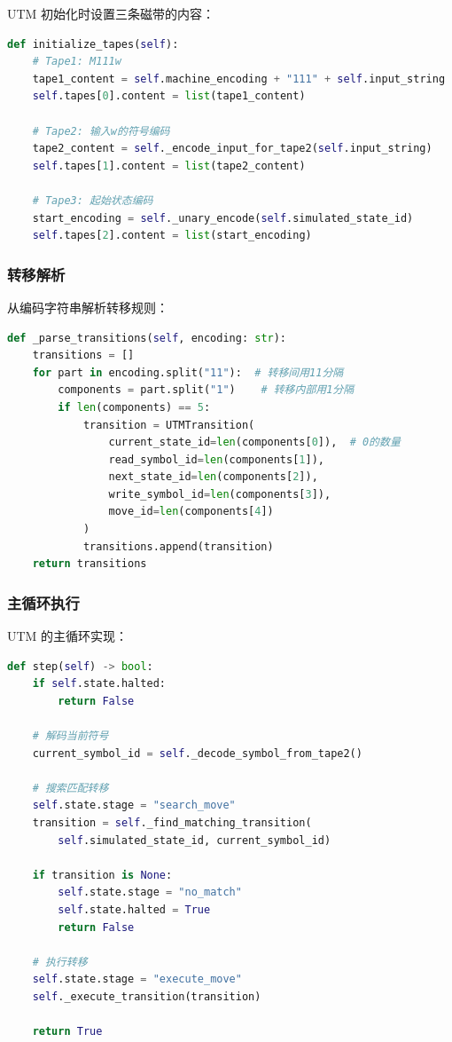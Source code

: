\documentclass{sysucseexp}
\begin{document}
UTM 初始化时设置三条磁带的内容：

\begin{lstlisting}[language=Python]
def initialize_tapes(self):
    # Tape1: M111w
    tape1_content = self.machine_encoding + "111" + self.input_string
    self.tapes[0].content = list(tape1_content)
    
    # Tape2: 输入w的符号编码
    tape2_content = self._encode_input_for_tape2(self.input_string)
    self.tapes[1].content = list(tape2_content)
    
    # Tape3: 起始状态编码
    start_encoding = self._unary_encode(self.simulated_state_id)
    self.tapes[2].content = list(start_encoding)
\end{lstlisting}

\subsubsection{转移解析}

从编码字符串解析转移规则：

\begin{lstlisting}[language=Python]
def _parse_transitions(self, encoding: str):
    transitions = []
    for part in encoding.split("11"):  # 转移间用11分隔
        components = part.split("1")    # 转移内部用1分隔
        if len(components) == 5:
            transition = UTMTransition(
                current_state_id=len(components[0]),  # 0的数量
                read_symbol_id=len(components[1]),
                next_state_id=len(components[2]),
                write_symbol_id=len(components[3]),
                move_id=len(components[4])
            )
            transitions.append(transition)
    return transitions
\end{lstlisting}

\subsubsection{主循环执行}

UTM 的主循环实现：

\begin{lstlisting}[language=Python]
def step(self) -> bool:
    if self.state.halted:
        return False
    
    # 解码当前符号
    current_symbol_id = self._decode_symbol_from_tape2()
    
    # 搜索匹配转移
    self.state.stage = "search_move"
    transition = self._find_matching_transition(
        self.simulated_state_id, current_symbol_id)
    
    if transition is None:
        self.state.stage = "no_match"
        self.state.halted = True
        return False
    
    # 执行转移
    self.state.stage = "execute_move"
    self._execute_transition(transition)
    
    return True
\end{lstlisting}
\end{document}
